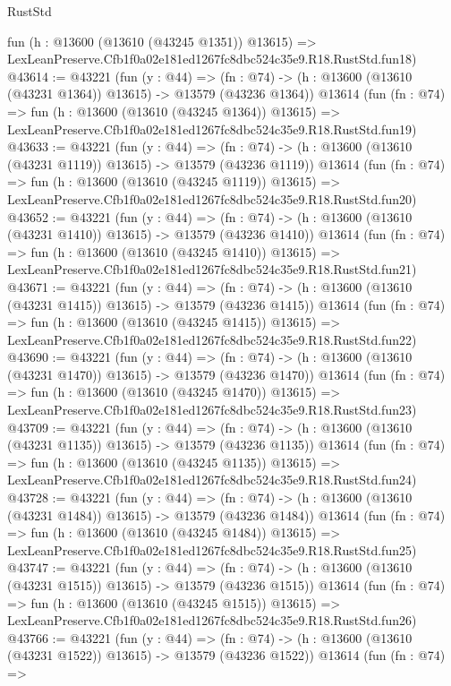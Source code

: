 \begin{lexlean}{RustStd}
\begin{coremodule}
    fun (h : @13600 (@13610 (@43245 @1351)) @13615) =>
    LexLeanPreserve.Cfb1f0a02e181ed1267fc8dbc524c35e9.R18.RustStd.fun18)
@43614 := @43221
    (fun (y : @44) =>
    (fn : @74) -> (h : @13600 (@13610 (@43231 @1364)) @13615) -> @13579 (@43236 @1364))
    @13614
    (fun (fn : @74) =>
    fun (h : @13600 (@13610 (@43245 @1364)) @13615) =>
    LexLeanPreserve.Cfb1f0a02e181ed1267fc8dbc524c35e9.R18.RustStd.fun19)
@43633 := @43221
    (fun (y : @44) =>
    (fn : @74) -> (h : @13600 (@13610 (@43231 @1119)) @13615) -> @13579 (@43236 @1119))
    @13614
    (fun (fn : @74) =>
    fun (h : @13600 (@13610 (@43245 @1119)) @13615) =>
    LexLeanPreserve.Cfb1f0a02e181ed1267fc8dbc524c35e9.R18.RustStd.fun20)
@43652 := @43221
    (fun (y : @44) =>
    (fn : @74) -> (h : @13600 (@13610 (@43231 @1410)) @13615) -> @13579 (@43236 @1410))
    @13614
    (fun (fn : @74) =>
    fun (h : @13600 (@13610 (@43245 @1410)) @13615) =>
    LexLeanPreserve.Cfb1f0a02e181ed1267fc8dbc524c35e9.R18.RustStd.fun21)
@43671 := @43221
    (fun (y : @44) =>
    (fn : @74) -> (h : @13600 (@13610 (@43231 @1415)) @13615) -> @13579 (@43236 @1415))
    @13614
    (fun (fn : @74) =>
    fun (h : @13600 (@13610 (@43245 @1415)) @13615) =>
    LexLeanPreserve.Cfb1f0a02e181ed1267fc8dbc524c35e9.R18.RustStd.fun22)
@43690 := @43221
    (fun (y : @44) =>
    (fn : @74) -> (h : @13600 (@13610 (@43231 @1470)) @13615) -> @13579 (@43236 @1470))
    @13614
    (fun (fn : @74) =>
    fun (h : @13600 (@13610 (@43245 @1470)) @13615) =>
    LexLeanPreserve.Cfb1f0a02e181ed1267fc8dbc524c35e9.R18.RustStd.fun23)
@43709 := @43221
    (fun (y : @44) =>
    (fn : @74) -> (h : @13600 (@13610 (@43231 @1135)) @13615) -> @13579 (@43236 @1135))
    @13614
    (fun (fn : @74) =>
    fun (h : @13600 (@13610 (@43245 @1135)) @13615) =>
    LexLeanPreserve.Cfb1f0a02e181ed1267fc8dbc524c35e9.R18.RustStd.fun24)
@43728 := @43221
    (fun (y : @44) =>
    (fn : @74) -> (h : @13600 (@13610 (@43231 @1484)) @13615) -> @13579 (@43236 @1484))
    @13614
    (fun (fn : @74) =>
    fun (h : @13600 (@13610 (@43245 @1484)) @13615) =>
    LexLeanPreserve.Cfb1f0a02e181ed1267fc8dbc524c35e9.R18.RustStd.fun25)
@43747 := @43221
    (fun (y : @44) =>
    (fn : @74) -> (h : @13600 (@13610 (@43231 @1515)) @13615) -> @13579 (@43236 @1515))
    @13614
    (fun (fn : @74) =>
    fun (h : @13600 (@13610 (@43245 @1515)) @13615) =>
    LexLeanPreserve.Cfb1f0a02e181ed1267fc8dbc524c35e9.R18.RustStd.fun26)
@43766 := @43221
    (fun (y : @44) =>
    (fn : @74) -> (h : @13600 (@13610 (@43231 @1522)) @13615) -> @13579 (@43236 @1522))
    @13614
    (fun (fn : @74) =>

\end{coremodule}
\end{lexlean}

